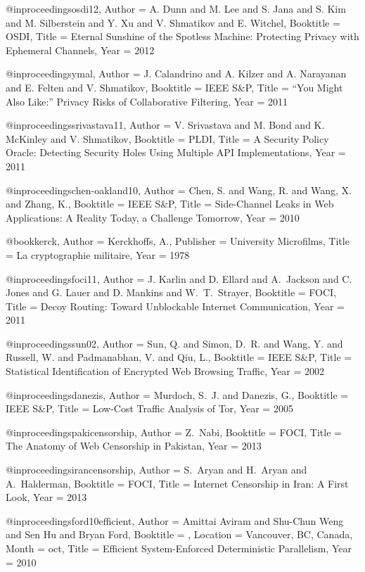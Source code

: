 {{{{{{{	@inproceedings{osdi12,
	Author = {A. Dunn and M. Lee and S. Jana and S. Kim and M. Silberstein and Y. Xu and V. Shmatikov and E. Witchel},
	Booktitle = {OSDI},
	Title = {{Eternal Sunshine of the Spotless Machine: Protecting Privacy with Ephemeral Channels}},
	Year = {2012}}
	
	@inproceedings{ymal,
	Author = {J. Calandrino and A. Kilzer and A. Narayanan and E. Felten and V. Shmatikov},
	Booktitle = {IEEE S\&P},
	Title = {{``You Might Also Like:'' Privacy Risks of Collaborative Filtering}},
	Year = {2011}}
	
	@inproceedings{srivastava11,
	Author = {V. Srivastava and M. Bond and K. McKinley and V. Shmatikov},
	Booktitle = {PLDI},
	Title = {{A Security Policy Oracle: Detecting Security Holes Using Multiple API Implementations}},
	Year = {2011}}
	
	@inproceedings{chen-oakland10,
	Author = {Chen, S. and Wang, R. and Wang, X. and Zhang, K.},
	Booktitle = {IEEE S\&P},
	Title = {{Side-Channel Leaks in Web Applications: A Reality Today, a Challenge Tomorrow}},
	Year = {2010}}
	
	@book{kerck,
	Author = {Kerckhoffs, A.},
	Publisher = {University Microfilms},
	Title = {{La cryptographie militaire}},
	Year = {1978}}
	
	@inproceedings{foci11,
	Author = {J. Karlin and D. Ellard and A.~Jackson and C.~ Jones and G. Lauer and D. Mankins and W.~T.~Strayer},
	Booktitle = {FOCI},
	Title = {{Decoy Routing: Toward Unblockable Internet Communication}},
	Year = 2011}
	
	@inproceedings{sun02,
	Author = {Sun, Q. and Simon, D.~R. and Wang, Y. and Russell, W. and Padmanabhan, V. and Qiu, L.},
	Booktitle = {IEEE S\&P},
	Title = {{Statistical Identification of Encrypted Web Browsing Traffic}},
	Year = {2002}}
	
	@inproceedings{danezis,
	Author = {Murdoch, S.~J. and Danezis, G.},
	Booktitle = {IEEE S\&P},
	Title = {{Low-Cost Traffic Analysis of Tor}},
	Year = {2005}}
	
	@inproceedings{pakicensorship,
	Author = {Z.~Nabi},
	Booktitle = {FOCI},
	Title = {The Anatomy of {Web} Censorship in {Pakistan}},
	Year = {2013}}
	
	@inproceedings{irancensorship,
	Author = {S.~Aryan and H.~Aryan and A.~Halderman},
	Booktitle = {FOCI},
	Title = {Internet Censorship in {Iran}: {A} First Look},
	Year = {2013}}
	
	@inproceedings{ford10efficient,
	Author = {Amittai Aviram and Shu-Chun Weng and Sen Hu and Bryan Ford},
	Booktitle = {},
	Location = {Vancouver, BC, Canada},
	Month = oct,
	Title = {Efficient System-Enforced Deterministic Parallelism},
	Year = 2010}
	
}}}}}}}
